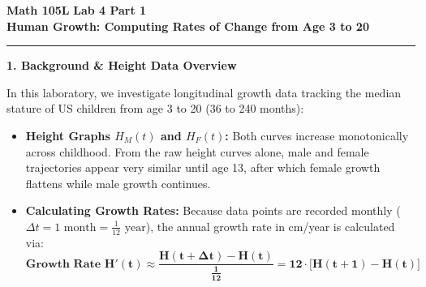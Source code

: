 \documentclass[10.5pt]{article}
\begin{document}
\noindent \textbf{\large Math 105L} \hfill \textbf{\large Lab 4 Part 1}\\[1pt]
{\textbf{\Large Human Growth: Computing Rates of Change from Age 3 to 20}}\\[-5pt]
\rule{\textwidth}{1.2pt}

\vspace{0.03in}

\textbf{\large 1. Background \& Height Data Overview}

In this laboratory, we investigate longitudinal growth data tracking the median stature of US children from age 3 to 20 (36 to 240 months):
\begin{itemize}[leftmargin=1.2em, topsep=1pt, itemsep=2pt]
  \item \textbf{Height Graphs $H_M(t)$ and $H_F(t)$:} Both curves increase monotonically across childhood. From the raw height curves alone, male and female trajectories appear very similar until age 13, after which female growth flattens while male growth continues.
  \item \textbf{Calculating Growth Rates:} Because data points are recorded monthly ($\Delta t = 1 \text{ month} = \frac{1}{12} \text{ year}$), the annual growth rate in cm/year is calculated via:
  \[
    \mathbf{\text{Growth Rate } H'(t) \approx \frac{H(t + \Delta t) - H(t)}{\frac{1}{12}} = 12 \cdot \big[H(t + 1) - H(t)\big]}
  \]
\end{itemize}

\vspace{0.03in}
\end{document}
